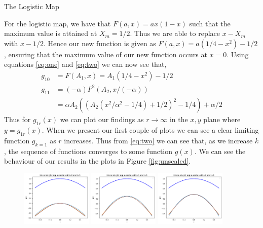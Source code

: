 \begin{exmp} The Logistic Map

    For the logistic map, we have that $F(a,x)=ax(1-x)$ such that the maximum value is attained at $X_m =1/2$. Thus we are able to replace $x-X_m$ with $x-1/2$. Hence our new function is given as $F(a,x)=a(1/4-x^2)-1/2$, ensuring that the maximum value of our new function occurs at $x=0$. Using equations \eqref{eq:one} and \eqref{eq:two} we can now see that,
    \begin{align}
        g_{10}&=F(A_1,x)=A_1(1/4-x^2)-1/2 \nonumber \\
        g_{11}&=(-\alpha)F^2(A_2,x/(-\alpha)) \nonumber \\
        &= \alpha A_2 \left(\left(A_2 \left(x^{2}/\alpha^2 - 1/4\right) + 1/2\right)^{2} - 1/4\right) + \alpha/2
    \end{align}
    Thus for $g_{1r}(x)$ we can plot our findings as $r \to \infty$ in the $x, y$ plane where $y=g_{1r}(x)$. 
	When we present our first couple of plots we can see a clear limiting function $g_{k=1}$ as $r$ increases. Thus from \eqref{eq:two} we can see that, as we increase $k$, the sequence of functions converges to some function $g(x)$. 
	We can see the behaviour of our results in the plots in Figure \ref{fig:unscaled}.
	\begin{figure}
    \centering
    \includegraphics[width=0.3\textwidth]{Feigenbaum Approx Graphs/Unscaled Graphs/us k=0.png}
    \includegraphics[width=0.3\textwidth]{Feigenbaum Approx Graphs/Unscaled Graphs/us k=1.png}
    \includegraphics[width=0.3\textwidth]{Feigenbaum Approx Graphs/Unscaled Graphs/us k=2.png}

\end{figure}
\end{exmp}
